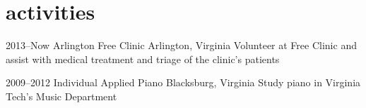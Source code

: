 \documentclass[]{friggeri-cv}
\begin{document}
\section{activities}

\begin{entrylist}

\entry
{2013--Now}
{Arlington Free Clinic}
{Arlington, Virginia}
{Volunteer at Free Clinic and assist with medical treatment and triage of the clinic's patients}

\entry
{2009--2012}
{Individual Applied Piano}
{Blacksburg, Virginia}
{Study piano in Virginia Tech's Music Department}
\end{entrylist}
\end{document}
